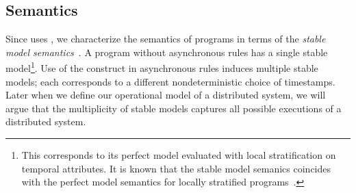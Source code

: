 
%


\subsection{Semantics}
Since \lang uses , we characterize the semantics of \lang programs in terms of the {\em stable model semantics}~\cite{stable-model}.  A \lang program without asynchronous rules has a single stable model\footnote{This corresponds to its perfect model evaluated with local stratification on temporal attributes.  It is known that the stable model semanics coincides with the perfect model semantics for locally stratified programs~\cite{stable-model}.}.  Use of the  construct in asynchronous rules induces multiple stable models; each corresponds to a different nondeterministic choice of timestamps.  Later when we define our operational model of a distributed system, we will argue that the multiplicity of stable models captures all possible executions of a distributed system.

